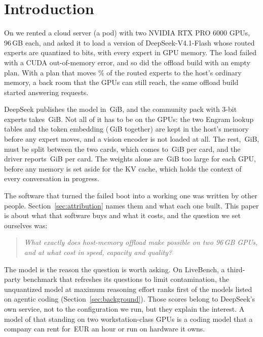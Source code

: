 \section{Introduction}\label{sec:intro}

On  we rented a cloud server (a pod) with two NVIDIA RTX PRO 6000 GPUs, 96\,GB each, and
asked it to load a version of DeepSeek-V4.1-Flash whose routed experts are quantized to  bits, with
every expert in GPU memory. The load failed with a CUDA out-of-memory error, and so did the offload build with an
empty plan. With a plan that moves \% of the routed experts to the host's
ordinary memory, a back room that the GPUs can still reach, the same offload build started answering requests.

DeepSeek publishes the model in \,GiB, and the community pack with 3-bit experts takes
\,GiB. Not all of it has to be on the GPUs: the two Engram lookup tables and the token
embedding (\,GiB together) are kept in the host's memory before any expert moves,
and a vision encoder is not loaded at all. The rest, \,GiB, must be split between the two cards, which comes to
\,GiB per card, and the driver reports \,GiB per card. The weights alone are \,GiB
too large for each GPU, before any memory is set aside for the KV cache, which holds the context of every conversation
in progress.

The software that turned the failed boot into a working one was written by other people. Section~\ref{sec:attribution}
names them and what each one built. This paper is about what that software buys and what it costs, and the question we
set ourselves was:
\begin{quote}
\emph{What exactly does host-memory offload make possible on two 96\,GB GPUs, and at what cost in speed, capacity and
quality?}
\end{quote}

The model is the reason the question is worth asking. On LiveBench, a third-party benchmark that refreshes its
questions to limit contamination, the unquantized model at maximum reasoning effort ranks first of the
 models listed on agentic coding (Section~\ref{sec:background}). Those scores belong to
DeepSeek's own service, not to the configuration we run, but they explain the interest. A model of that standing on
two workstation-class GPUs is a coding model that a company can rent for \,EUR an hour or
run on hardware it owns.


